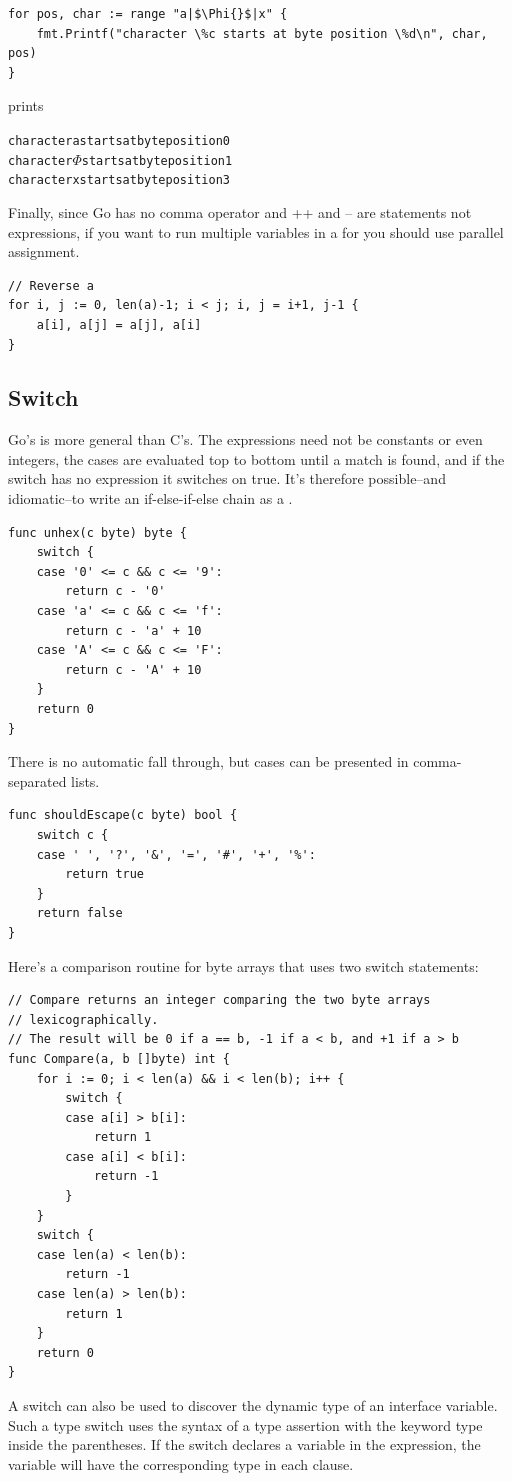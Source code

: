 \begin{lstlisting}
for pos, char := range "a|$\Phi{}$|x" {
    fmt.Printf("character \%c starts at byte position \%d\n", char, pos)
}
\end{lstlisting}
prints
\begin{alltt}
character a starts at byte position 0
character \begin{math}\Phi\end{math} starts at byte position 1
character x starts at byte position 3
\end{alltt}
Finally, since Go has no comma operator and ++ and -- are statements not
expressions, if you want to run multiple variables in a for you should
use parallel assignment.
\begin{lstlisting}
// Reverse a
for i, j := 0, len(a)-1; i < j; i, j = i+1, j-1 {
    a[i], a[j] = a[j], a[i]
}
\end{lstlisting}

\subsection{Switch}
Go's  is more general than C's. The expressions need not be
constants or even integers, the cases are evaluated top to bottom until
a match is found, and if the switch has no expression it switches on
true. It's therefore possible--and idiomatic--to write an if-else-if-else
chain as a .
\begin{lstlisting}
func unhex(c byte) byte {
    switch {
    case '0' <= c && c <= '9':
        return c - '0'
    case 'a' <= c && c <= 'f':
        return c - 'a' + 10
    case 'A' <= c && c <= 'F':
        return c - 'A' + 10
    }
    return 0
}
\end{lstlisting}
There is no automatic fall through, but cases can be presented in comma-separated lists.

\begin{lstlisting}
func shouldEscape(c byte) bool {
    switch c {
    case ' ', '?', '&', '=', '#', '+', '%':
        return true
    }
    return false
}
\end{lstlisting}
Here's a comparison routine for byte arrays that uses two switch statements:

\begin{lstlisting}
// Compare returns an integer comparing the two byte arrays
// lexicographically.
// The result will be 0 if a == b, -1 if a < b, and +1 if a > b
func Compare(a, b []byte) int {
    for i := 0; i < len(a) && i < len(b); i++ {
        switch {
        case a[i] > b[i]:
            return 1
        case a[i] < b[i]:
            return -1
        }
    }
    switch {
    case len(a) < len(b):
        return -1
    case len(a) > len(b):
        return 1
    }
    return 0
}
\end{lstlisting}
A switch can also be used to discover the dynamic type of an interface
variable. Such a type switch uses 
the syntax of a type assertion with the keyword type inside the
parentheses. If the switch declares a variable in the expression, the
variable will have the corresponding type in each clause.

